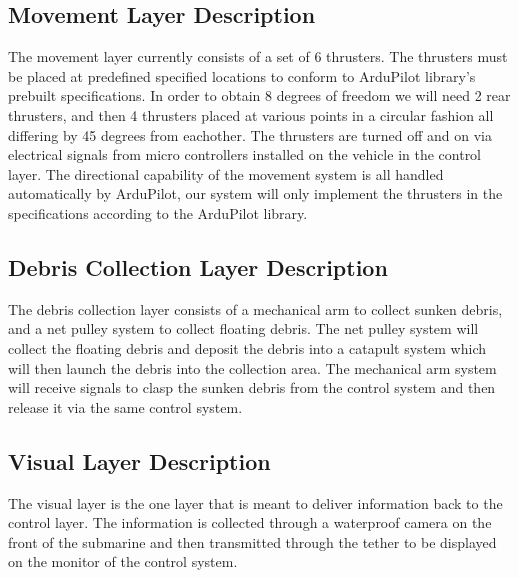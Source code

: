 \subsection{Movement Layer Description}
	The movement layer currently consists of a set of 6 thrusters. The thrusters must be placed at predefined specified locations to conform to ArduPilot library's prebuilt specifications. In order to obtain 8 degrees of freedom we will need 2 rear thrusters, and then 4 thrusters placed at various points in a circular fashion all differing by 45 degrees from eachother. The thrusters are turned off and on via electrical signals from micro controllers installed on the vehicle in the control layer. The directional capability of the movement system is all handled automatically by ArduPilot, our system will only implement the thrusters in the specifications according to the ArduPilot library.

\subsection{Debris Collection Layer Description}
	The debris collection layer consists of a mechanical arm to collect sunken debris, and a net pulley system to collect floating debris. The net pulley system will collect the floating debris and deposit the debris into a catapult system which will then launch the debris into the collection area. The mechanical arm system will receive signals to clasp the sunken debris from the control system and then release it via the same control system.

\subsection{Visual Layer Description}
The visual layer is the one layer that is meant to deliver information back to the control layer. The information is collected through a waterproof camera on the front of the submarine and then transmitted through the tether to be displayed on the monitor of the control system.  